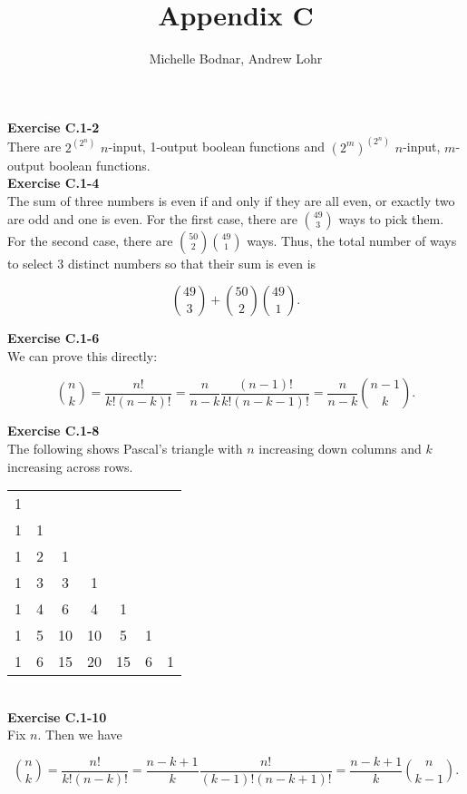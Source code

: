\documentclass{article}
\title{Appendix C}
\author{Michelle Bodnar, Andrew Lohr}
\begin{document}
\maketitle

\noindent\textbf{Exercise C.1-2}\\

There are $2^{(2^n)}$ $n$-input, 1-output boolean functions and $(2^m)^{(2^n)}$ $n$-input, $m$-output boolean functions. \\

\noindent\textbf{Exercise C.1-4}\\

The sum of three numbers is even if and only if they are all even, or exactly two are odd and one is even.  For the first case, there are ${49 \choose 3}$ ways to pick them.  For the second case, there are ${50 \choose 2} {49 \choose 1}$ ways.  Thus, the total number of ways to select 3 distinct numbers so that their sum is even is 

\[ {49 \choose 3} + {50 \choose 2}{49 \choose 1}.\]

\noindent\textbf{Exercise C.1-6}\\

We can prove this directly:

\[ {n \choose k} = \frac{n!}{k!(n-k)!} = \frac{n}{n-k}\frac{(n-1)!}{k!(n-k-1)!} = \frac{n}{n-k} {n-1 \choose k}.\]

\noindent\textbf{Exercise C.1-8}\\

The following shows Pascal's triangle with $n$ increasing down columns and $k$ increasing across rows. \\

\begin{tabular}{ccccccc}
1 &&&&&& \\
1 & 1 &&&&& \\
1 & 2 & 1 &&&& \\
1 & 3 & 3 & 1 &&& \\
1 & 4 & 6 & 4 & 1 &&\\
1 & 5  & 10 & 10 & 5 & 1 &\\
1 & 6 & 15 & 20 & 15 & 6 & 1
\end{tabular}\\

\noindent\textbf{Exercise C.1-10}\\

Fix $n$.  Then we have 

\[{n \choose k} = \frac{n!}{k!(n-k)!} = \frac{n-k+1}{k} \frac{n!}{(k-1)!(n-k+1)!} = \frac{n-k+1}{k}{n \choose k-1}.\]
\end{document}
